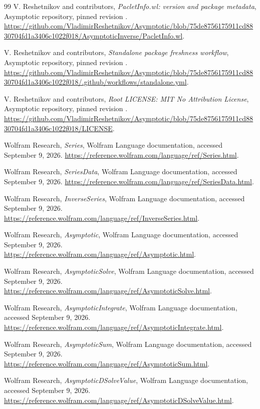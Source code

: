 \begin{thebibliography}{99}
 V. Reshetnikov and contributors, \emph{PacletInfo.wl: version and package metadata}, Asymptotic repository, pinned revision \commit. \url{https://github.com/VladimirReshetnikov/Asymptotic/blob/75de8756175911cd8830704fd1a3406c1022f018/AsymptoticInverse/PacletInfo.wl}.

 V. Reshetnikov and contributors, \emph{Standalone package freshness workflow}, Asymptotic repository, pinned revision \commit. \url{https://github.com/VladimirReshetnikov/Asymptotic/blob/75de8756175911cd8830704fd1a3406c1022f018/.github/workflows/standalone.yml}.

 V. Reshetnikov and contributors, \emph{Root LICENSE: MIT No Attribution License}, Asymptotic repository, pinned revision \commit. \url{https://github.com/VladimirReshetnikov/Asymptotic/blob/75de8756175911cd8830704fd1a3406c1022f018/LICENSE}.

 Wolfram Research, \emph{Series}, Wolfram Language documentation, accessed September 9, 2026. \url{https://reference.wolfram.com/language/ref/Series.html}.

 Wolfram Research, \emph{SeriesData}, Wolfram Language documentation, accessed September 9, 2026. \url{https://reference.wolfram.com/language/ref/SeriesData.html}.

 Wolfram Research, \emph{InverseSeries}, Wolfram Language documentation, accessed September 9, 2026. \url{https://reference.wolfram.com/language/ref/InverseSeries.html}.

 Wolfram Research, \emph{Asymptotic}, Wolfram Language documentation, accessed September 9, 2026. \url{https://reference.wolfram.com/language/ref/Asymptotic.html}.

 Wolfram Research, \emph{AsymptoticSolve}, Wolfram Language documentation, accessed September 9, 2026. \url{https://reference.wolfram.com/language/ref/AsymptoticSolve.html}.

 Wolfram Research, \emph{AsymptoticIntegrate}, Wolfram Language documentation, accessed September 9, 2026. \url{https://reference.wolfram.com/language/ref/AsymptoticIntegrate.html}.

 Wolfram Research, \emph{AsymptoticSum}, Wolfram Language documentation, accessed September 9, 2026. \url{https://reference.wolfram.com/language/ref/AsymptoticSum.html}.

 Wolfram Research, \emph{AsymptoticDSolveValue}, Wolfram Language documentation, accessed September 9, 2026. \url{https://reference.wolfram.com/language/ref/AsymptoticDSolveValue.html}.


\end{thebibliography}
